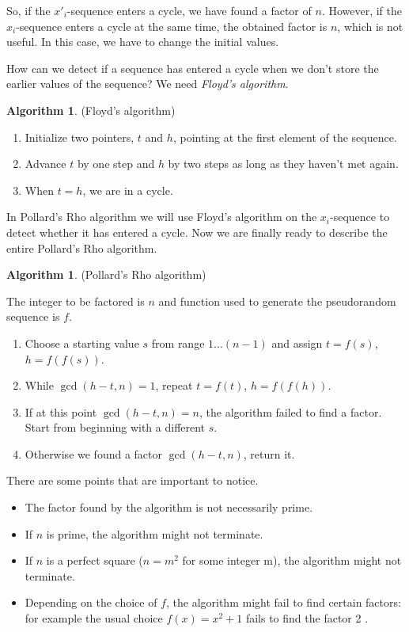 \documentclass[12pt] {article}
\theoremstyle{plain}
\theoremstyle{definition}
\newtheorem{algo}[thm]{Algorithm}
\begin{document}
So, if the $x'_i$-sequence enters a cycle, we have found a factor of $n$. However, if the $x_i$-sequence enters a cycle at the same time, the obtained factor is $n$, which is not useful. In this case, we have to change the initial values.

How can we detect if a sequence has entered a cycle when we don't store the earlier values of the sequence? We need \textit{Floyd's algorithm}\cite{cphb}.

\begin{algo} (Floyd's algorithm)
\begin{enumerate}
\item Initialize two pointers, $t$ and $h$, pointing at the first element of the sequence.
\item Advance $t$ by one step and $h$ by two steps as long as they haven't met again.
\item When $t = h$, we are in a cycle.
\end{enumerate}
\end{algo}

In Pollard's Rho algorithm we will use Floyd's algorithm on the $x_i$-sequence to detect whether it has entered a cycle. Now we are finally ready to describe the entire Pollard's Rho algorithm.

\begin{algo} (Pollard's Rho algorithm)

The integer to be factored is $n$ and function used to generate the pseudorandom sequence is $f$.
\begin{enumerate}
\item Choose a starting value $s$ from range $1 \dots (n-1)$ and assign $t = f(s)$, $h = f(f(s))$.
\item While $\gcd(h-t, n) = 1$, repeat $t = f(t)$, $h = f(f(h))$.
\item If at this point $\gcd(h-t, n) = n$, the algorithm failed to find a factor. Start from beginning with a different $s$.
\item Otherwise we found a factor $\gcd(h-t, n)$, return it.
\end{enumerate}
\end{algo}

There are some points that are important to notice.

\begin{itemize}
\item The factor found by the algorithm is not necessarily prime.
\item If $n$ is prime, the algorithm might not terminate.
\item If $n$ is a perfect square ($n = m^2$ for some integer m), the algorithm might not terminate.
\item Depending on the choice of $f$, the algorithm might fail to find certain factors: for example the usual choice $f(x) = x^2 + 1$ fails to find the factor 2 \cite{pollardfail}.
\end{itemize}
\end{document}

